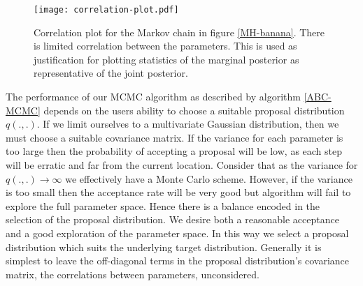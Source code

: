 \begin{figure}[H]
	\centering
	\texttt{[image: correlation-plot.pdf]}
	\caption{Correlation plot for the Markov chain in figure \ref{MH-banana}. There is limited correlation between the parameters. This is used as justification for plotting statistics of the marginal posterior as representative of the joint posterior.}
	\label{correlation-plot}
\end{figure}


The performance of our MCMC algorithm as described by algorithm \ref{ABC-MCMC} depends on the users ability to choose a suitable proposal distribution $q(.,.)$. If we limit ourselves to a multivariate Gaussian distribution, then we must choose a suitable covariance matrix. If the variance for each parameter is too large then the probability of accepting a proposal will be low, as each step will be erratic and far from the current location. Consider that as the variance for $q(.,.) \rightarrow \infty$ we effectively have a Monte Carlo scheme. However, if the variance is too small then the acceptance rate will be very good but algorithm will fail to explore the full parameter space. Hence there is a balance encoded in the selection of the proposal distribution. We desire both a reasonable acceptance and a good exploration of the parameter space. In this way we select a proposal distribution which suits the underlying target distribution. Generally it is simplest to leave the off-diagonal terms in the proposal distribution's covariance matrix, the correlations between parameters, unconsidered.\\

